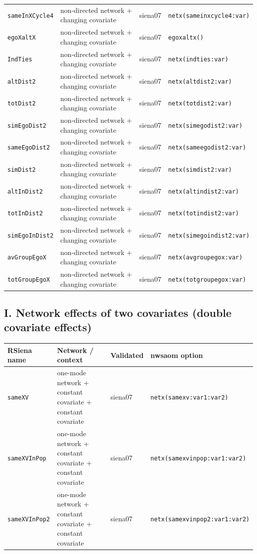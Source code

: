 \begin{longtable}{@{}p{2.6cm}p{3.2cm}p{2.9cm}p{5.4cm}@{}}
\texttt{sameInXCycle4} & non-directed network + changing covariate & siena07 & \texttt{netx(sameinxcycle4:var)}\\
\texttt{egoXaltX} & non-directed network + changing covariate & siena07 & \texttt{egoxaltx()}\\
\texttt{IndTies} & non-directed network + changing covariate & siena07 & \texttt{netx(indties:var)}\\
\texttt{altDist2} & non-directed network + changing covariate & siena07 & \texttt{netx(altdist2:var)}\\
\texttt{totDist2} & non-directed network + changing covariate & siena07 & \texttt{netx(totdist2:var)}\\
\texttt{simEgoDist2} & non-directed network + changing covariate & siena07 & \texttt{netx(simegodist2:var)}\\
\texttt{sameEgoDist2} & non-directed network + changing covariate & siena07 & \texttt{netx(sameegodist2:var)}\\
\texttt{simDist2} & non-directed network + changing covariate & siena07 & \texttt{netx(simdist2:var)}\\
\texttt{altInDist2} & non-directed network + changing covariate & siena07 & \texttt{netx(altindist2:var)}\\
\texttt{totInDist2} & non-directed network + changing covariate & siena07 & \texttt{netx(totindist2:var)}\\
\texttt{simEgoInDist2} & non-directed network + changing covariate & siena07 & \texttt{netx(simegoindist2:var)}\\
\texttt{avGroupEgoX} & non-directed network + changing covariate & siena07 & \texttt{netx(avgroupegox:var)}\\
\texttt{totGroupEgoX} & non-directed network + changing covariate & siena07 & \texttt{netx(totgroupegox:var)}\\
\bottomrule
\end{longtable}
\normalsize

\subsection*{I. Network effects of two covariates (double covariate effects)}
\footnotesize
\begin{longtable}{@{}p{2.6cm}p{3.2cm}p{2.9cm}p{5.4cm}@{}}
\toprule
RSiena name & Network / context & Validated & nwsaom option\\
\midrule
\endhead
\texttt{sameXV} & one-mode network + constant covariate + constant covariate & siena07 & \texttt{netx(samexv:var1:var2)}\\
\texttt{sameXVInPop} & one-mode network + constant covariate + constant covariate & siena07 & \texttt{netx(samexvinpop:var1:var2)}\\
\texttt{sameXVInPop2} & one-mode network + constant covariate + constant covariate & siena07 & \texttt{netx(samexvinpop2:var1:var2)}\\
\bottomrule
\end{longtable}
\normalsize

